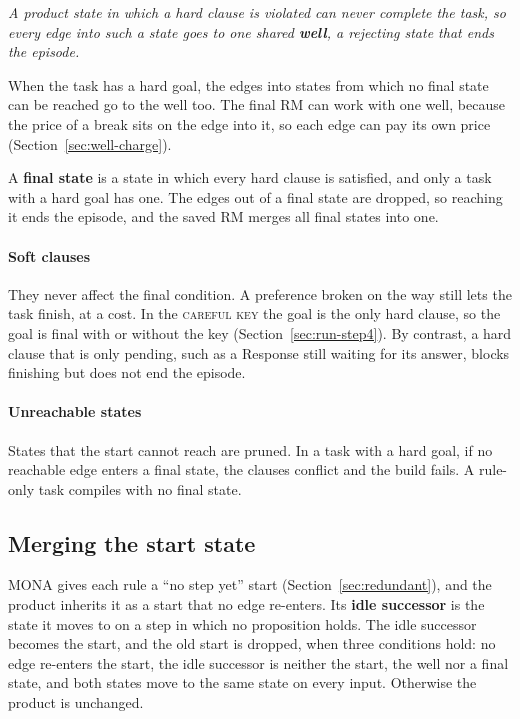 \documentclass[11pt,english,listoffigures,listoftables]{tfgetsinf}
\newcommand{\runex}[1]{\textsc{#1}}  %
\newcommand{\keyidea}[1]{\par\smallskip\noindent\hspace*{0.6em}{\color{gray!55}\vrule width 1.5pt}\hspace{8pt}\parbox[t]{\dimexpr\linewidth-0.6em-9.5pt\relax}{\itshape #1}\par\smallskip}  %
\begin{document}
\keyidea{A product state in which a hard clause is violated can never complete the task, so every edge into such a state goes to one shared \textbf{well}, a rejecting state that ends the episode.}

\noindent When the task has a hard goal, the edges into states from which no final state can be reached go to the well too. The final RM can work with one well, because the price of a break sits on the edge into it, so each edge can pay its own price (Section~\ref{sec:well-charge}).

A \textbf{final state} is a state in which every hard clause is satisfied, and only a task with a hard goal has one. The edges out of a final state are dropped, so reaching it ends the episode, and the saved RM merges all final states into one.

\paragraph{Soft clauses} They never affect the final condition. A preference broken on the way still lets the task finish, at a cost. In the \runex{careful key} the goal is the only hard clause, so the goal is final with or without the key (Section~\ref{sec:run-step4}). By contrast, a hard clause that is only pending, such as a Response still waiting for its answer, blocks finishing but does not end the episode.

\paragraph{Unreachable states} States that the start cannot reach are pruned. In a task with a hard goal, if no reachable edge enters a final state, the clauses conflict and the build fails. A rule-only task compiles with no final state.

\subsection{Merging the start state}
\label{sec:start-merge}
MONA gives each rule a ``no step yet'' start (Section~\ref{sec:redundant}), and the product inherits it as a start that no edge re-enters. Its \textbf{idle successor} is the state it moves to on a step in which no proposition holds. The idle successor becomes the start, and the old start is dropped, when three conditions hold: no edge re-enters the start, the idle successor is neither the start, the well nor a final state, and both states move to the same state on every input. Otherwise the product is unchanged.
\end{document}
